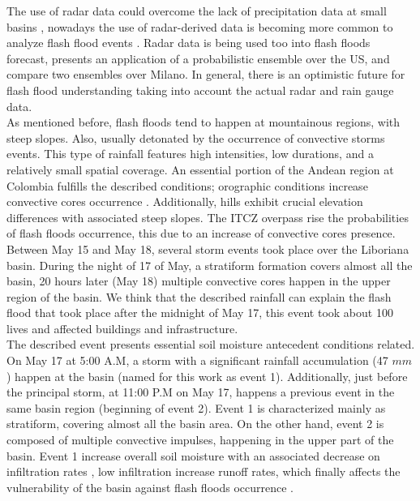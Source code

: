 {The use of radar data could overcome the lack of precipitation data at small basins \citep{Creutin2003}, nowadays the use of radar-derived data is becoming more common to analyze flash flood events \citep{Salek2006,Garambois2015}.  Radar data is being used too into flash floods forecast, \citet{Hardy2016} presents an application of a probabilistic ensemble over the US, and \citet{Ravazzani2016} compare two ensembles over Milano.  In general, there is an optimistic future for flash flood understanding taking into account the actual radar and rain gauge data\citep{Braud2016}.\\   

As mentioned before, flash floods tend to happen at mountainous regions, with steep slopes. Also, usually detonated by the occurrence of convective storms events. This type of rainfall features high intensities, low durations, and a relatively small spatial coverage.  An essential portion of the Andean region at Colombia fulfills the described conditions; orographic conditions increase convective cores occurrence \citep{Poveda2007}. Additionally, hills exhibit crucial elevation differences with associated steep slopes. The ITCZ overpass rise the probabilities of flash floods occurrence, this due to an increase of convective cores presence.\\   

Between May 15 and May 18, several storm events took place over the Liboriana basin. During the night of 17 of May, a stratiform formation covers almost all the basin, 20 hours later (May 18) multiple convective cores happen in the upper region of the basin.  We think that the described rainfall can explain the flash flood that took place after the midnight of May 17, this event took about 100 lives and affected buildings and infrastructure.\\   

The described event presents essential soil moisture antecedent conditions related. On May 17 at 5:00 A.M, a storm with a significant rainfall accumulation (47 $mm$) happen at the basin (named for this work as event 1).  Additionally, just before the principal storm, at 11:00 P.M on May 17, happens a previous event in the same basin region (beginning of event 2).  Event 1 is characterized mainly as stratiform, covering almost all the basin area.  On the other hand, event 2 is composed of multiple convective impulses, happening in the upper part of the basin. Event 1 increase overall soil moisture with an associated decrease on infiltration rates \citep{Penna2011,Zehe2010}, low infiltration increase runoff rates, which finally affects the vulnerability of the basin against flash floods occurrence \citep{Wagner1999,Penna2011,Tramblay2012b}. \\

}
